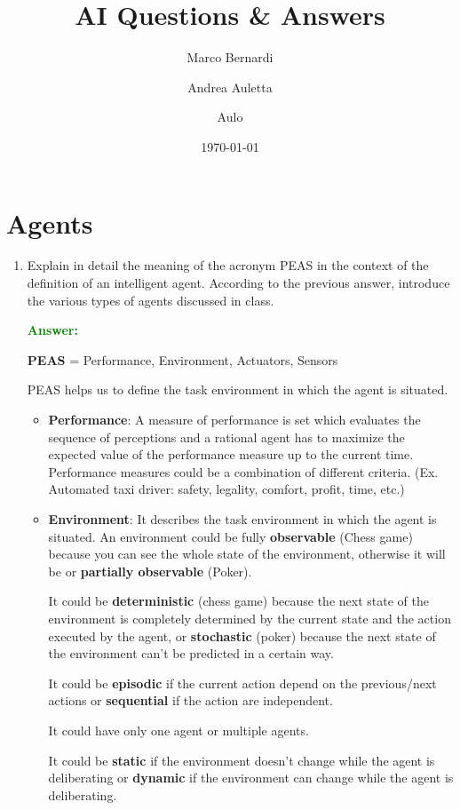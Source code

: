 \documentclass[12pt]{article}
\title{AI Questions \& Answers}
\author{
    Marco Bernardi
    \and
    Andrea Auletta
    \and
    Aulo
}
\date{\today}
\begin{document}
\maketitle
\section{Agents}
\begin{enumerate}[label=\textbf{A.\arabic*}]
    \item Explain in detail the meaning of the acronym PEAS in the context of the definition of an intelligent agent. 
    According to the previous answer, introduce the various types of agents discussed in class.
    
    \textcolor{green}{\textbf{Answer:}}
    
    \textbf{PEAS} = Performance, Environment, Actuators, Sensors

    PEAS helps us to define the task environment in which the agent is situated.
    \begin{itemize}
        \item \textbf{Performance}: A measure of performance is set which evaluates the sequence of perceptions 
        and a rational agent has to maximize the expected value of the performance measure up to the current time.
        Performance measures could be a combination of different criteria. (Ex. Automated taxi driver: safety, legality, comfort, profit, time, etc.) 
        \item \textbf{Environment}: It describes the task environment in which the agent is situated.
        An environment could be fully \textbf{observable} (Chess game) because you can see the whole state of the environment, otherwise it will be 
        or \textbf{partially observable} (Poker).

        It could be \textbf{deterministic} (chess game) because the next state of the environment is completely determined 
        by the current state and the action executed by the agent,
        or \textbf{stochastic} (poker) because the next state of the environment can't be predicted in a certain way.

        It could be \textbf{episodic} if the current action depend on the previous/next actions or \textbf{sequential} if the action are independent.
        
        It could have only one agent or multiple agents.

        It could be \textbf{static} if the environment doesn't change while the agent is deliberating or \textbf{dynamic} if the environment can change while the agent is deliberating.


\end{itemize}
\end{enumerate}
\end{document}
